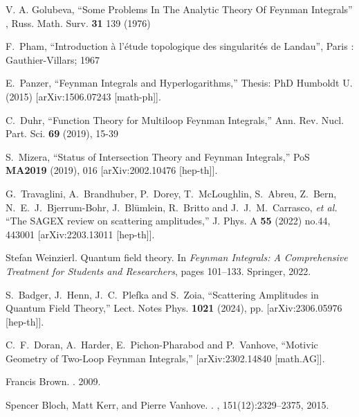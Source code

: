 \documentclass[a4paper,12pt]{article}
\numberwithin{equation}{section}
\numberwithin{figure}{section}
\begin{document}
\begin{thebibliography}{99}



  
 V. A. Golubeva, ``Some Problems In The Analytic
  Theory Of Feynman Integrals'' , Russ. Math. Surv. {\bf 31} 139 (1976)

 F.~Pham, ``Introduction \`a l'\'etude topologique des
  singularit\'es de Landau'', Paris : Gauthier-Villars; 1967

E.~Panzer,
``Feynman Integrals and Hyperlogarithms,''
Thesis: PhD Humboldt U. (2015)
[arXiv:1506.07243 [math-ph]].

C.~Duhr,
``Function Theory for Multiloop Feynman Integrals,''
Ann. Rev. Nucl. Part. Sci. \textbf{69} (2019), 15-39

S.~Mizera,
``Status of Intersection Theory and Feynman Integrals,''
PoS \textbf{MA2019} (2019), 016
[arXiv:2002.10476 [hep-th]].

G.~Travaglini, A.~Brandhuber, P.~Dorey, T.~McLoughlin, S.~Abreu, Z.~Bern, N.~E.~J.~Bjerrum-Bohr, J.~Bl\"umlein, R.~Britto and J.~J.~M.~Carrasco, \textit{et al.}
``The SAGEX review on scattering amplitudes,''
J. Phys. A \textbf{55} (2022) no.44, 443001
[arXiv:2203.13011 [hep-th]].

Stefan Weinzierl.
\newblock Quantum field theory.
\newblock In {\em Feynman Integrals: A Comprehensive Treatment for Students and
  Researchers}, pages 101--133. Springer, 2022.
\newblock [arXiv:2201.03593] 


S.~Badger, J.~Henn, J.~C.~Plefka and S.~Zoia,
``Scattering Amplitudes in Quantum Field Theory,''
Lect. Notes Phys. \textbf{1021} (2024), pp.
[arXiv:2306.05976 [hep-th]].


C.~F.~Doran, A.~Harder, E.~Pichon-Pharabod and P.~Vanhove,
``Motivic Geometry of Two-Loop Feynman Integrals,''
[arXiv:2302.14840 [math.AG]].


Francis Brown.
.
 2009.
\newblock [arXiv:0910.0114]  

Spencer Bloch, Matt Kerr, and Pierre Vanhove.
.
, 151(12):2329--2375, 2015.
\newblock [arXiv:1406.2664] 


\end{thebibliography}
\end{document}
